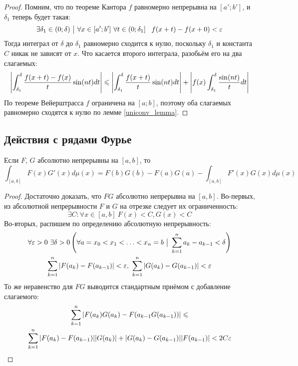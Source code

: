 \begin{proof}
	Помним, что по теореме Кантора $f$ равномерно непрерывна на $[a'; b']$, и $\delta_1$ теперь будет такая:
	\[
		\exists \delta_1 \in (0; \delta) \ \big|\  \forall x \in [a'; b']\ \forall t \in \left(0; \delta_1\right]\ \ f(x + t) - f(x + 0) < \varepsilon
	\]
	Тогда интеграл от $\delta$ до $\delta_1$ равномерно сходится к нулю, поскольку $\delta_1$ и константа $C$ никак не зависят от $x$. Что касается второго интеграла, разобьём его на два слагаемых:
	\[
		\left|\int_{\delta_1}^\delta \frac{f(x+t) - f(x)}{t} \sin(nt) dt\right| \leqslant \left|\int_{\delta_1}^\delta \frac{f(x+t)}{t} \sin(nt) dt\right| + \left|f(x) \int_{\delta_1}^\delta \frac{\sin(nt)}{t} dt\right|
	\]
	По теореме Вейерштрасса $f$ ограничена на $[a; b]$, поэтому оба слагаемых равномерно сходятся к нулю по лемме \ref{uniconv_lemma}.
\end{proof}

\subsection{Действия с рядами Фурье}

\begin{lemma} \label{abs_int_product}
	Если $F$, $G$ абсолютно непрерывны на $[a, b]$, то
	\[
		\int_{[a, b]} F(x)G'(x)d\mu(x) = F(b)G(b) - F(a)G(a) - \int_{[a, b]} F'(x)G(x)d\mu(x)
	\]
\end{lemma}

\begin{proof}
	Достаточно доказать, что $FG$ абсолютно непрерывна на $[a, b]$. Во-первых, из абсолютной непрерывности $F$ и $G$ на отрезке следует их ограниченность:
	\[
		\exists C : \forall x \in [a, b] \ F(x) < C, G(x) < C
	\]
	Во-вторых, распишем по определению абсолютную непрерывность:
	\begin{multline*}
		\forall \varepsilon > 0 \ \exists \delta > 0 \left( \forall a = x_0 < x_1 < \ldots < x_n = b \ \big|\  \sum_{k=1}^n a_k - a_{k-1} < \delta\right) \\ \sum_{k=1}^n |F(a_k) - F(a_{k-1})| < \varepsilon, \ \sum_{k=1}^n |G(a_k) - G(a_{k-1})| < \varepsilon
	\end{multline*}
	То же неравенство для $FG$ выводится стандартным приёмом с добавление слагаемого:
	\begin{multline*}
		\sum_{k=1}^n |F(a_k)G(a_k) - F(a_{k-1}G(a_{k-1}))| \leqslant \\ \sum_{k=1}^n |F(a_k) - F(a_{k-1})||G(a_k)| + |G(a_k) - G(a_{k-1})||F(a_{k-1})| < 2C\varepsilon 
	\end{multline*}
\end{proof}

